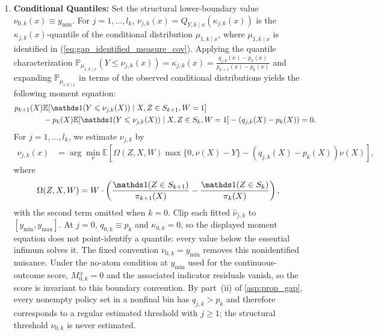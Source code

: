 \begin{enumerate}
    \[
        q_{j,k}(x)=\mathbb E[q(Z,x)\mid Z\in T_{j,k},X=x]
    \]
    and its sample analog $\hat q_{j,k}(x)=\sum_{z\in\widehat T_{j,k}}\hat a_{j,k}(z,x)\hat q(z,x)$. At the population law, every $q(z,x)$ in $T_{j,k}$ equals $q_{j,k}(x)$, so pooling preserves the boundary while giving it a regular extension when estimated instrument-specific levels are not exactly tied. Estimate the two conditional probabilities defining $\gamma_{\mathrm{full},k}$ from their respective set indicators, clip each estimate to $[0,1]$, and subtract. Estimate $\gamma_{j,k}$ and the tail weight
    \[
        \gamma_K(x)\coloneqq\mathbb P_{\mathrm{obs}}\!\left(Z \in \bigcup_{j=1}^{l_K} T_{j,K} \mathrel{\Big|} X=x\right)
    \]
    from their set indicators and also clip them to $[0,1]$.
    \item \textbf{Conditional Quantiles:} Set the structural lower-boundary value $\nu_{0,k}(x)\equiv y_{\min}$. For $j=1,\ldots,l_k$, $\nu_{j,k}(x) = Q_{Y,k \mid x}(\kappa_{j,k}(x))$ is the $\kappa_{j,k}(x)$-quantile of the conditional distribution $\mu_{1,k \mid x}$, where $\mu_{1,k \mid x}$ is identified in (\ref{eq:gap_identified_measure_cov}).
    Applying the quantile characterization $\mathbb{P}_{\mu_{1,k \mid x}}(Y \leqslant \nu_{j,k}(x)) = \kappa_{j,k}(x) = \frac{q_{j,k}(x) - p_k(x)}{p_{k+1}(x) - p_k(x)}$ and expanding $\mathbb{P}_{\mu_{1,k \mid x}}$ in terms of the observed conditional distributions yields the following moment equation:
    \begin{align*}
    p_{k+1} (X)&\mathbb{E} [\indicator (Y\leqslant \nu _{j,k} (X))\mid X,Z\in S_{k+1}, W=1 ]\\
    &-p_{k} (X)\mathbb{E} [ \indicator  (Y\leqslant \nu _{j,k} (X))\mid X,Z\in S_{k}, W=1 ]-(q_{j,k} (X)-p_{k} (X)) =0.
\end{align*}
For $j=1,\ldots,l_k$, we estimate $\nu_{j,k}$ by
\begin{align*}
\nu_{j,k}( x) & =\arg\min_{\nu }\mathbb{E}\left[\Omega(Z,X, W)\max\{0,\nu ( X) -Y\} -( q_{j,k}( X) -p_{k}( X)) \nu ( X)\right],
\end{align*}
where
\[
\Omega(Z,X, W) = W \cdot \left(\frac{\indicator(Z\in S_{k+1} )}{\pi _{k+1}( X)} -\frac{ \indicator(Z\in S_{k} )}{\pi _{k}( X)}\right),
\]
    with the second term omitted when $k=0$. Clip each fitted $\hat\nu_{j,k}$ to $[y_{\min},y_{\max}]$. At $j=0$, $q_{0,k}\equiv p_k$ and $\kappa_{0,k}=0$, so the displayed moment equation does not point-identify a quantile: every value below the essential infimum solves it. The fixed convention $\nu_{0,k}=y_{\min}$ removes this nonidentified nuisance. Under the no-atom condition at $y_{\min}$ used for the continuous-outcome score, $M_{0,k}^{\pm}=0$ and the associated indicator residuals vanish, so the score is invariant to this boundary convention. By part~\textup{(ii)} of \cref{asp:prop_gap}, every nonempty policy set in a nonfinal bin has $q_{j,k}>p_k$ and therefore corresponds to a regular estimated threshold with $j\geqslant1$; the structural threshold $\nu_{0,k}$ is never estimated.

\end{enumerate}
